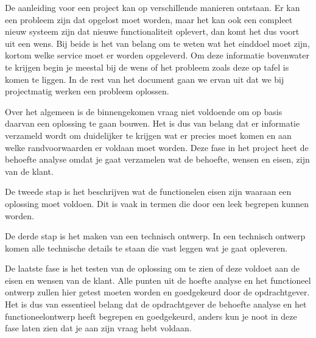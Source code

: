 De aanleiding voor een project kan op verschillende manieren ontstaan. Er kan een probleem zijn dat opgelost moet worden, maar het kan ook een compleet nieuw systeem zijn dat nieuwe functionaliteit oplevert, dan komt het dus voort uit een wens. Bij beide is het van belang om te weten wat het einddoel moet zijn, kortom welke service moet er worden opgeleverd. Om deze informatie bovenwater te krijgen begin je meestal bij de wens of het probleem zoals deze op tafel is komen te liggen. In de rest van het document gaan we ervan uit dat we bij projectmatig werken een probleem oplossen.

Over het algemeen is de binnengekomen vraag niet voldoende om op basis daarvan een oplossing te gaan bouwen. Het is dus van belang dat er informatie verzameld wordt om duidelijker te krijgen wat er precies moet komen en aan welke randvoorwaarden er voldaan moet worden. Deze fase in het project heet de behoefte analyse omdat je gaat verzamelen wat de behoefte, wensen en eisen, zijn van de klant.

De tweede stap is het beschrijven wat de functionelen eisen zijn waaraan een oplossing moet voldoen. Dit is vaak in termen die door een leek begrepen kunnen worden.

De derde stap is het maken van een technisch ontwerp. In een technisch ontwerp komen alle technische details te staan die vast leggen wat je gaat opleveren.

De laatste fase is het testen van de oplossing om te zien of deze voldoet aan de eisen en wensen van de klant. Alle punten uit de hoefte analyse en het functioneel ontwerp zullen hier getest moeten worden en goedgekeurd door de opdrachtgever. Het is dus van essentieel belang dat de opdrachtgever de behoefte analyse en het functioneelontwerp heeft begrepen en goedgekeurd, anders kun je noot in deze fase laten zien dat je aan zijn vraag hebt voldaan.
